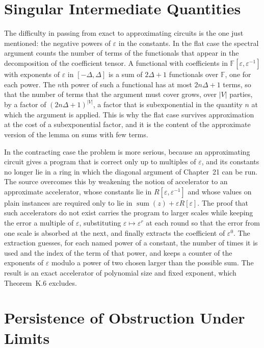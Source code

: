 \documentclass[11pt,letterpaper]{report}
\theoremstyle{plain}
\theoremstyle{definition}
\theoremstyle{remark}
\begin{document}
\section{Singular Intermediate Quantities}

The difficulty in passing from exact to approximating circuits is the one just mentioned: the negative powers of $\varepsilon$ in the constants. In the flat case the spectral argument counts the number of terms of the functionals that appear in the decomposition of the coefficient tensor. A functional with coefficients in $\mathbb F[\varepsilon,\varepsilon^{-1}]$ with exponents of $\varepsilon$ in $[-\Delta,\Delta]$ is a sum of $2\Delta+1$ functionals over $\mathbb F$, one for each power. The $n$th power of such a functional has at most $2n\Delta+1$ terms, so that the number of terms that the argument must cover grows, over $|V|$ parties, by a factor of $(2n\Delta+1)^{|V|}$, a factor that is subexponential in the quantity $n$ at which the argument is applied. This is why the flat case survives approximation at the cost of a subexponential factor, and it is the content of the approximate version of the lemma on sums with few terms.

In the contracting case the problem is more serious, because an approximating circuit gives a program that is correct only up to multiples of $\varepsilon$, and its constants no longer lie in a ring in which the diagonal argument of Chapter~21 can be run. The source overcomes this by weakening the notion of accelerator to an approximate accelerator, whose constants lie in $R[\varepsilon,\varepsilon^{-1}]$ and whose values on plain instances are required only to lie in $\operatorname{sum}(z)+\varepsilon R[\varepsilon]$. The proof that such accelerators do not exist carries the program to larger scales while keeping the error a multiple of $\varepsilon$, substituting $\varepsilon\mapsto\varepsilon^r$ at each round so that the error from one scale is absorbed at the next, and finally extracts the coefficient of $\varepsilon^0$. The extraction guesses, for each named power of a constant, the number of times it is used and the index of the term of that power, and keeps a counter of the exponents of $\varepsilon$ modulo a power of two chosen larger than the possible sum. The result is an exact accelerator of polynomial size and fixed exponent, which Theorem~K.6 excludes.

\section{Persistence of Obstruction Under Limits}
\end{document}
